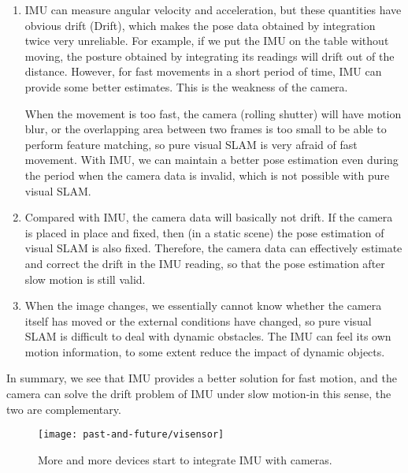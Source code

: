 \begin{enumerate}
	\item IMU can measure angular velocity and acceleration, but these quantities have obvious drift (Drift), which makes the pose data obtained by integration twice very unreliable. For example, if we put the IMU on the table without moving, the posture obtained by integrating its readings will drift out of the distance. However, for fast movements in a short period of time, IMU can provide some better estimates. This is the weakness of the camera.
	
	When the movement is too fast, the camera (rolling shutter) will have motion blur, or the overlapping area between two frames is too small to be able to perform feature matching, so pure visual SLAM is very afraid of fast movement. With IMU, we can maintain a better pose estimation even during the period when the camera data is invalid, which is not possible with pure visual SLAM.
	
	\item Compared with IMU, the camera data will basically not drift. If the camera is placed in place and fixed, then (in a static scene) the pose estimation of visual SLAM is also fixed. Therefore, the camera data can effectively estimate and correct the drift in the IMU reading, so that the pose estimation after slow motion is still valid.
	
	\item When the image changes, we essentially cannot know whether the camera itself has moved or the external conditions have changed, so pure visual SLAM is difficult to deal with dynamic obstacles. The IMU can feel its own motion information, to some extent reduce the impact of dynamic objects.
\end{enumerate}

In summary, we see that IMU provides a better solution for fast motion, and the camera can solve the drift problem of IMU under slow motion-in this sense, the two are complementary.

\begin{figure}[!thp]
	\centering
	\texttt{[image: past-and-future/visensor]}
	\caption{More and more devices start to integrate IMU with cameras. }
	\label{fig:visensor}
\end{figure}

